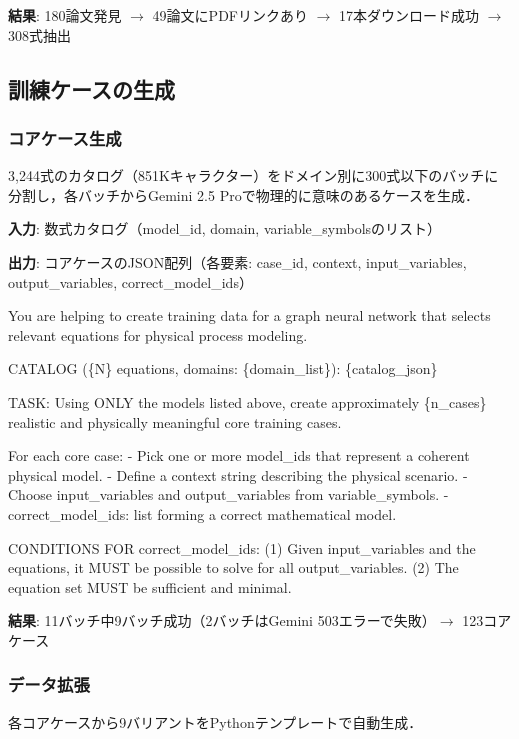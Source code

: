 \documentclass[11pt,a4paper]{ltjsarticle}
\begin{document}
\textbf{結果}: 180論文発見 $\to$ 49論文にPDFリンクあり $\to$ 17本ダウンロード成功 $\to$ 308式抽出

\subsection{訓練ケースの生成}

\subsubsection{コアケース生成}

3,244式のカタログ（851Kキャラクター）をドメイン別に300式以下のバッチに分割し，各バッチからGemini 2.5 Proで物理的に意味のあるケースを生成．

\textbf{入力}: 数式カタログ（model\_id, domain, variable\_symbolsのリスト）

\textbf{出力}: コアケースのJSON配列（各要素: case\_id, context, input\_variables, output\_variables, correct\_model\_ids）

\begin{promptbox}
You are helping to create training data for a graph neural network
that selects relevant equations for physical process modeling.

CATALOG (\{N\} equations, domains: \{domain\_list\}):
\{catalog\_json\}

TASK: Using ONLY the models listed above, create approximately
\{n\_cases\} realistic and physically meaningful core training cases.

For each core case:
- Pick one or more model\_ids that represent a coherent physical model.
- Define a context string describing the physical scenario.
- Choose input\_variables and output\_variables from variable\_symbols.
- correct\_model\_ids: list forming a correct mathematical model.

CONDITIONS FOR correct\_model\_ids:
(1) Given input\_variables and the equations, it MUST be possible
    to solve for all output\_variables.
(2) The equation set MUST be sufficient and minimal.
\end{promptbox}

\textbf{結果}: 11バッチ中9バッチ成功（2バッチはGemini 503エラーで失敗）$\to$ 123コアケース

\subsubsection{データ拡張}

各コアケースから9バリアントをPythonテンプレートで自動生成．
\end{document}
